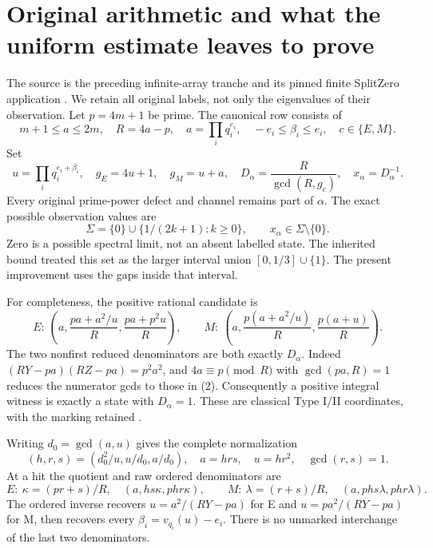 \section{Original arithmetic and what the uniform estimate leaves to prove}
The source is the preceding infinite-array tranche and its pinned finite
SplitZero application \cite{Prior,Boundary}. We retain all original labels,
not only the eigenvalues of their observation. Let $p=4m+1$ be prime. The
canonical row consists of
\[
 m+1\le a\le2m,\quad R=4a-p,\quad
 a=\prod_iq_i^{e_i},\quad -e_i\le\beta_i\le e_i,\quad c\in\{E,M\}.
 \tag{1}
\]
Set
\[
 u=\prod_iq_i^{e_i+\beta_i},\quad g_E=4u+1,\quad g_M=u+a,\quad
 D_\alpha=\frac R{\gcd(R,g_c)},\quad x_\alpha=D_\alpha^{-1}.
 \tag{2}
\]
Every original prime-power defect and channel remains part of $\alpha$.
The exact possible observation values are
\[
 \Sigma=\{0\}\cup\{1/(2k+1):k\ge0\},
 \qquad x_\alpha\in\Sigma\setminus\{0\}.
 \tag{3}
\]
Zero is a possible spectral limit, not an absent labelled state.
The inherited bound treated this set as the larger interval union
$[0,1/3]\cup\{1\}$. The present improvement uses the gaps inside that interval.

For completeness, the positive rational candidate is
\[
 E:\ \left(a,\frac{pa+a^2/u}{R},\frac{pa+p^2u}{R}\right),\qquad
 M:\ \left(a,\frac{p(a+a^2/u)}R,\frac{p(a+u)}R\right).
 \tag{4}
\]
The two nonfirst reduced denominators are both exactly $D_\alpha$.
Indeed $(RY-pa)(RZ-pa)=p^2a^2$, and $4a\equiv p\pmod R$ with
$\gcd(pa,R)=1$ reduces the numerator gcds to those in (2).
Consequently a positive integral witness is exactly a state with $D_\alpha=1$.
These are classical Type I/II coordinates, with the marking retained
\cite[\S2, Propositions 2.2 and 2.6]{ET}.

Writing $d_0=\gcd(a,u)$ gives the complete normalization
\[
 (h,r,s)=(d_0^2/u,u/d_0,a/d_0),\quad a=hrs,\quad u=hr^2,\quad\gcd(r,s)=1.
\]
At a hit the quotient and raw ordered denominators are
\[
 E:\ \kappa=(pr+s)/R,\quad(a,hs\kappa,phr\kappa),\qquad
 M:\ \lambda=(r+s)/R,\quad(a,phs\lambda,phr\lambda).
 \tag{5}
\]
The ordered inverse recovers $u=a^2/(RY-pa)$ for E and
$u=pa^2/(RY-pa)$ for M, then recovers every $\beta_i=v_{q_i}(u)-e_i$.
There is no unmarked interchange of the last two denominators.

